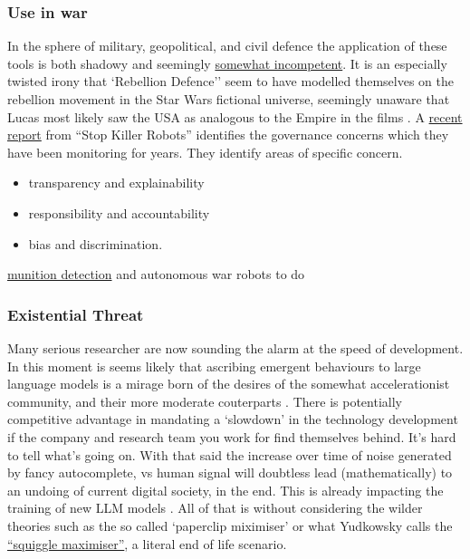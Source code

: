 \subsubsection{Use in war}
In the sphere of military, geopolitical, and civil defence the application of these tools is both shadowy and seemingly \href{https://www.vox.com/recode/23507236/inside-disruption-rebellion-defense-washington-connected-military-tech-startup}{somewhat incompetent}. It is an especially twisted irony that `Rebellion Defence'' seem to have modelled themselves on the rebellion movement in the Star Wars fictional universe, seemingly unaware that Lucas most likely saw the USA as analogous to the Empire in the films \cite{immerwahr202221}. A \href{https://www.stopkillerrobots.org/wp-content/uploads/2022/10/ADR-Artificial-intelligence-and-automated-decisions-Single-View.pdf}{recent report} from ``Stop Killer Robots'' identifies the governance concerns which they have been monitoring for years. They identify areas of specific concern.
\begin{itemize}
\item transparency and explainability \item responsibility and  accountability
\item bias and discrimination.
\end{itemize}
\href{https://vframe.io/9n235/}{munition detection}  and autonomous war robots to do
\subsubsection{Existential Threat}
Many serious researcher are now sounding the alarm at the speed of development. In this moment is seems likely that ascribing emergent behaviours to large language models is a mirage born of the desires of the somewhat accelerationist community, and their more moderate couterparts \cite{schaeffer2023emergent}. There is potentially competitive advantage in mandating a `slowdown' in the technology development if the company and research team you work for find themselves behind. It's hard to tell what's going on. With that said the increase over time of noise generated by fancy autocomplete, vs human signal will doubtless lead (mathematically) to an undoing of current digital society, in the end. This is already impacting the training of new LLM models \cite{shumailov2023curse}. All of that is without considering the wilder theories such as the so called `paperclip miximiser' \cite{bostrom2003ethical}
or what Yudkowsky calls the \href{https://www.lesswrong.com/tag/squiggle-maximizer-formerly-paperclip-maximizer}{``squiggle maximiser''}, a literal end of life scenario.
